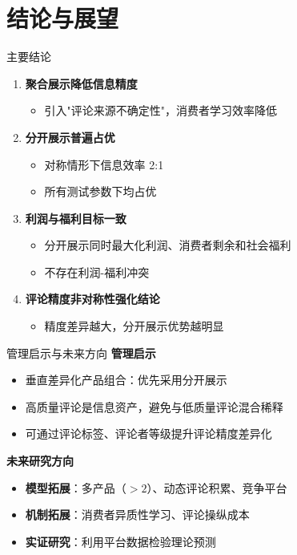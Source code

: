 \documentclass[aspectratio=169,10pt]{beamer}
\newcommand{\pos}[1]{\textcolor{positive}{#1}}
\begin{document}
\section{结论与展望}

\begin{frame}{主要结论}
\begin{enumerate}
    \item \textbf{聚合展示降低信息精度}
    \begin{itemize}
        \item 引入"评论来源不确定性"，消费者学习效率降低
    \end{itemize}

    \vspace{6pt}
    \item \textbf{分开展示普遍占优}
    \begin{itemize}
        \item 对称情形下信息效率 2:1
        \item 所有测试参数下均占优
    \end{itemize}

    \vspace{6pt}
    \item \textbf{利润与福利目标一致}
    \begin{itemize}
        \item 分开展示同时最大化利润、消费者剩余和社会福利
        \item 不存在利润-福利冲突
    \end{itemize}

    \vspace{6pt}
    \item \textbf{评论精度非对称性强化结论}
    \begin{itemize}
        \item 精度差异越大，分开展示优势越明显
    \end{itemize}
\end{enumerate}
\end{frame}

\begin{frame}{管理启示与未来方向}
\textbf{管理启示}
\begin{itemize}
    \item 垂直差异化产品组合：优先采用\pos{分开展示}
    \item 高质量评论是信息资产，避免与低质量评论混合稀释
    \item 可通过评论标签、评论者等级提升评论精度差异化
\end{itemize}

\vspace{10pt}
\textbf{未来研究方向}
\begin{itemize}
    \item \textbf{模型拓展}：多产品（$>2$）、动态评论积累、竞争平台
    \item \textbf{机制拓展}：消费者异质性学习、评论操纵成本
    \item \textbf{实证研究}：利用平台数据检验理论预测
\end{itemize}
\end{frame}
\end{document}
